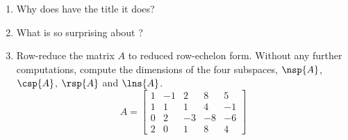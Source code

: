 \begin{enumerate}
%
\item Why does  have the title it does?
%
\item What is so surprising about ?
%
\item Row-reduce the matrix $A$ to reduced row-echelon form.  Without any further computations, compute the dimensions of the four subspaces, $\nsp{A}$, $\csp{A}$, $\rsp{A}$  and $\lns{A}$.
%
\begin{equation*}
A= 
\begin{bmatrix}
 1 & -1 & 2 & 8 & 5 \\
 1 & 1 & 1 & 4 & -1 \\
 0 & 2 & -3 & -8 & -6 \\
 2 & 0 & 1 & 8 & 4
\end{bmatrix}
\end{equation*}
%
\end{enumerate}